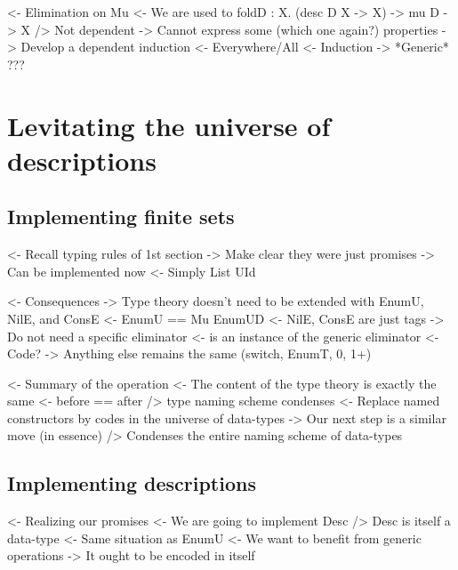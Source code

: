 \documentclass{article}
\newenvironment{structure}{\footnotesize\verbatim}{\endverbatim}
\begin{document}
\begin{structure}
<- Elimination on Mu
    <- We are used to foldD : \forall X. (desc D X -> X) -> mu D -> X
        /> Not dependent
        -> Cannot express some (which one again?) properties
    -> Develop a dependent induction
        <- Everywhere/All
        <- Induction
    -> *Generic*
    ???
\end{structure}

\section{Levitating the universe of descriptions}

\subsection{Implementing finite sets}

\begin{structure}
<- Recall typing rules of 1st section
    -> Make clear they were just promises
    -> Can be implemented now
        <- Simply List UId
\end{structure}

\begin{structure}
<- Consequences
    -> Type theory doesn't need to be extended with EnumU, NilE, and ConsE
        <- EnumU == Mu EnumUD
        <- NilE, ConsE are just tags
    -> Do not need a specific \spi eliminator
        <- \spi is an instance of the generic eliminator
            <- Code?
    -> Anything else remains the same (switch, EnumT, 0, 1+)
\end{structure}

\begin{structure}
<- Summary of the operation
    <- The content of the type theory is exactly the same
        <- before == after
    /> type naming scheme condenses
        <- Replace named constructors by codes in the universe of data-types
    -> Our next step is a similar move (in essence)
        /> Condenses the entire naming scheme of data-types
\end{structure}

\subsection{Implementing descriptions}

\begin{structure}
<- Realizing our promises
    <- We are going to implement Desc
    /> Desc is itself a data-type
        <- Same situation as EnumU
            <- We want to benefit from generic operations
        -> It ought to be encoded in itself
\end{structure}
\end{document}
